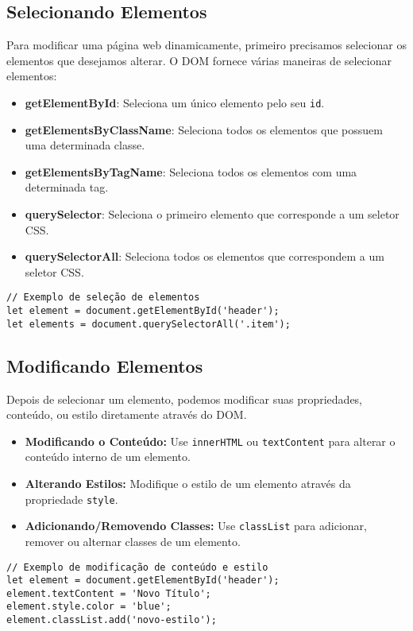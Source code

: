 \subsection{Selecionando Elementos}
Para modificar uma página web dinamicamente, primeiro precisamos selecionar os elementos que desejamos alterar. O DOM fornece várias maneiras de selecionar elementos:

\begin{itemize}
    \item \textbf{getElementById}: Seleciona um único elemento pelo seu \texttt{id}.
    \item \textbf{getElementsByClassName}: Seleciona todos os elementos que possuem uma determinada classe.
    \item \textbf{getElementsByTagName}: Seleciona todos os elementos com uma determinada tag.
    \item \textbf{querySelector}: Seleciona o primeiro elemento que corresponde a um seletor CSS.
    \item \textbf{querySelectorAll}: Seleciona todos os elementos que correspondem a um seletor CSS.
\end{itemize}

\begin{verbatim}
// Exemplo de seleção de elementos
let element = document.getElementById('header');
let elements = document.querySelectorAll('.item');
\end{verbatim}

\subsection{Modificando Elementos}
Depois de selecionar um elemento, podemos modificar suas propriedades, conteúdo, ou estilo diretamente através do DOM.

\begin{itemize}
    \item \textbf{Modificando o Conteúdo:} Use \texttt{innerHTML} ou \texttt{textContent} para alterar o conteúdo interno de um elemento.
    \item \textbf{Alterando Estilos:} Modifique o estilo de um elemento através da propriedade \texttt{style}.
    \item \textbf{Adicionando/Removendo Classes:} Use \texttt{classList} para adicionar, remover ou alternar classes de um elemento.
\end{itemize}

\begin{verbatim}
// Exemplo de modificação de conteúdo e estilo
let element = document.getElementById('header');
element.textContent = 'Novo Título';
element.style.color = 'blue';
element.classList.add('novo-estilo');
\end{verbatim}

